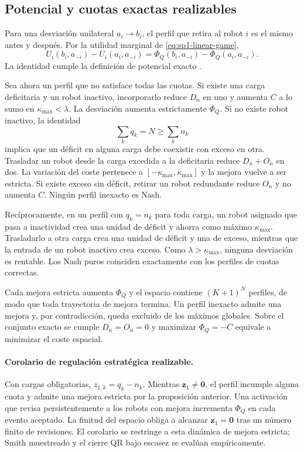 \subsection{Potencial y cuotas exactas realizables}
\label{app:sp1-feasible-proof}

Para una desviación unilateral $a_i\to b_i$, el perfil que retira al robot $i$ es el mismo antes y después. Por la utilidad marginal de \eqref{eq:sp1-linear-game},
\[
 U_i(b_i,a_{-i})-U_i(a_i,a_{-i})
 =\Phi_Q(b_i,a_{-i})-\Phi_Q(a_i,a_{-i}).
\]
La identidad cumple la definición de potencial exacto \parencite{monderer1996potential}.

Sea ahora un perfil que no satisface todas las cuotas. Si existe una carga deficitaria y un robot inactivo, incorporarlo reduce $D_n$ en uno y aumenta $C$ a lo sumo en $\kappa_{\max}<\lambda$. La desviación aumenta estrictamente $\Phi_Q$. Si no existe robot inactivo, la identidad
\[
 \sum_kq_k=N\geq\sum_kn_k
\]
implica que un déficit en alguna carga debe coexistir con exceso en otra. Trasladar un robot desde la carga excedida a la deficitaria reduce $D_n+O_n$ en dos. La variación del coste pertenece a $[-\kappa_{\max},\kappa_{\max}]$ y la mejora vuelve a ser estricta. Si existe exceso sin déficit, retirar un robot redundante reduce $O_n$ y no aumenta $C$. Ningún perfil inexacto es Nash.

Recíprocamente, en un perfil con $q_k=n_k$ para toda carga, un robot asignado que pasa a inactividad crea una unidad de déficit y ahorra como máximo $\kappa_{\max}$. Trasladarlo a otra carga crea una unidad de déficit y una de exceso, mientras que la entrada de un robot inactivo crea exceso. Como $\lambda>\kappa_{\max}$, ninguna desviación es rentable. Los Nash puros coinciden exactamente con los perfiles de cuotas correctas.

Cada mejora estricta aumenta $\Phi_Q$ y el espacio contiene $(K+1)^N$ perfiles, de modo que toda trayectoria de mejora termina. Un perfil inexacto admite una mejora y, por contradicción, queda excluido de los máximos globales. Sobre el conjunto exacto se cumple $D_n=O_n=0$ y maximizar $\Phi_Q=-C$ equivale a minimizar el coste espacial.

\paragraph{Corolario de regulación estratégica realizable.}
Con cargas obligatorias, $z_{1,k}=q_k-n_k$. Mientras $\boldsymbol z_1\neq\boldsymbol0$, el perfil incumple alguna cuota y admite una mejora estricta por la proposición anterior. Una activación que revisa persistentemente a los robots con mejora incrementa $\Phi_Q$ en cada evento aceptado. La finitud del espacio obliga a alcanzar $\boldsymbol z_1=\boldsymbol0$ tras un número finito de revisiones. El corolario se restringe a esta dinámica de mejora estricta; Smith muestreado y el cierre QR bajo escasez se evalúan empíricamente.

